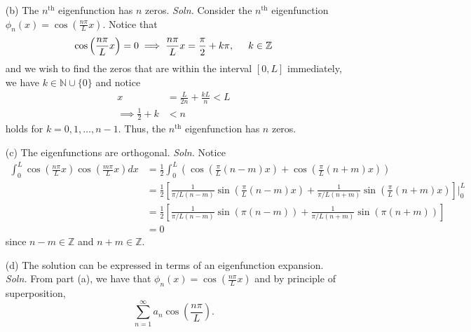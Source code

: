 \documentclass{article}
\begin{document}
\begin{itemize}
\begin{itemize}
        \item[(b)] The $n^{\text{th}}$ eigenfunction has $n$ zeros.
        \newline\newline
        \textit{Soln.} Consider the $n^{\text{th}}$ eigenfunction $\phi_n(x) = \cos\left(\frac{n\pi}{L}x\right)$. Notice that 
        \[\cos\left(\frac{n\pi}{L}x\right) = 0 \implies \frac{n\pi}{L}x = \frac{\pi}{2} + k\pi, \hspace{0.5cm} k \in \mathbb{Z}\]
        and we wish to find the zeros that are within the interval $[0,L]$ immediately, we have $k \in \mathbb{N}\cup \{0\}$ and notice
        \begin{align*}
            x &= \frac{L}{2n} + \frac{kL}{n} < L\\
            \implies \frac{1}{2} + k &< n
        \end{align*}
        holds for $k = 0, 1, \dots, n-1$. Thus, the $n^{\text{th}}$ eigenfunction has $n$ zeros.

        \item[(c)] The eigenfunctions are orthogonal.
        \newline\newline
        \textit{Soln.} Notice
        \begin{align*}
            \int_0^L \cos\left(\frac{n\pi}{L}x\right)\cos\left(\frac{m\pi}{L}x\right)dx &= \frac{1}{2}\int_0^L \left(\cos\left(\frac{\pi}{L}(n - m)x\right) + \cos\left(\frac{\pi}{L}(n + m)x\right)\right) \tag{$n \neq m$}\\
            &= \frac{1}{2}\left[\frac{1}{\pi/L(n - m)}\sin\left(\frac{\pi}{L}(n-m)x\right) + \frac{1}{\pi/L(n + m)}\sin\left(\frac{\pi}{L}(n + m)x\right)\right]\bigg|_0^L\\
            &= \frac{1}{2}\left[\frac{1}{\pi/L(n - m)}\sin(\pi(n - m)) + \frac{1}{\pi/L(n + m)}\sin(\pi(n + m))\right]\\
            &= 0
        \end{align*}
        since $n-m \in \mathbb{Z}$ and $n + m \in \mathbb{Z}$.
        \newline\newline

        \item[(d)] The solution can be expressed in terms of an eigenfunction expansion.
        \newline\newline
        \textit{Soln.} From part (a), we have that $\phi_n(x) = \cos\left(\frac{n\pi}{L}x\right)$ and by principle of superposition, 
        \[\sum_{n = 1}^{\infty} a_n \cos\left(\frac{n\pi}{L}\right).\]
        


\end{itemize}
\end{itemize}
\end{document}
